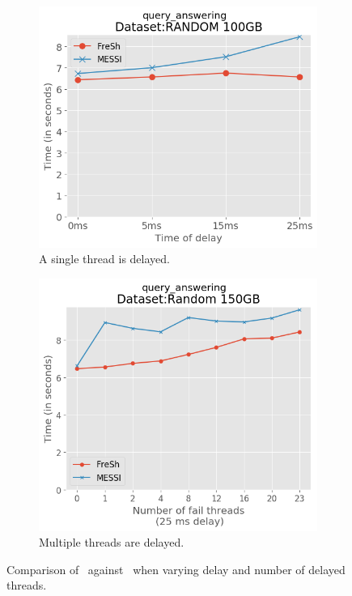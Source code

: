 \begin{figure}[htbp]
    \centering
    \begin{subfigure}{0.45\textwidth}  
        \includegraphics[width=\textwidth]{figures/Experiments/failure-delay-random-query25ms.png}
        \caption{A single thread is delayed.}
        \label{fig:eval:failure-query:random:failure1}
    \end{subfigure}    
    \begin{subfigure}{0.45\textwidth}  
        \includegraphics[width=\textwidth]{figures/Experiments/fail-threads-random-query25ms.png}
        \caption{Multiple threads are delayed.}
        \label{fig:eval:failure-query:random:failure2}
    \end{subfigure}    

    \caption{Comparison of \Fresh\ against \MESSI\ when varying delay and number of delayed threads.}
    \label{fig:eval:failure-query:random}
\end{figure}

